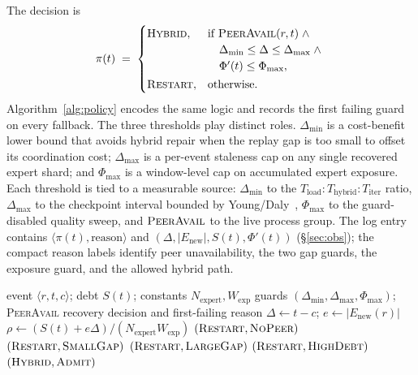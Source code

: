 \documentclass[10pt,conference]{IEEEtran}
\begin{document}
The decision is
\begin{equation}
    \label{eq:policy}
    \pi(t) \;=\;
    \begin{cases}
        \textsc{Hybrid}, & \text{if } \textsc{PeerAvail}(r,t) \;\wedge\; \\
                         & \quad \Delta_{\min} \leq \Delta \leq \Delta_{\max} \;\wedge\; \\
                         & \quad \Phi'(t) \leq \Phi_{\max}, \\[2pt]
        \textsc{Restart}, & \text{otherwise}.
    \end{cases}
\end{equation}
Algorithm~\ref{alg:policy} encodes the same logic and records the first failing guard on every fallback. The three thresholds play distinct roles. $\Delta_{\min}$ is a cost-benefit lower bound that avoids hybrid repair when the replay gap is too small to offset its coordination cost; $\Delta_{\max}$ is a per-event staleness cap on any single recovered expert shard; and $\Phi_{\max}$ is a window-level cap on accumulated expert exposure. Each threshold is tied to a measurable source: $\Delta_{\min}$ to the $T_{\text{load}}\!:\!T_{\text{hybrid}}\!:\!T_{\text{iter}}$ ratio, $\Delta_{\max}$ to the checkpoint interval bounded by Young/Daly~\cite{young1974first,daly2006higher}, $\Phi_{\max}$ to the guard-disabled quality sweep, and $\textsc{PeerAvail}$ to the live process group. The log entry contains $\langle\pi(t),\text{reason}\rangle$ and $(\Delta,|E_{\text{new}}|,S(t),\Phi'(t))$ (\S\ref{sec:obs}); the compact reason labels identify peer unavailability, the two gap guards, the exposure guard, and the allowed hybrid path.

\begin{algorithm}[!b]
\caption{Guarded recovery decision $\pi(t)$.}
\label{alg:policy}
\begin{algorithmic}[1]
\Require event $\langle r,t,c\rangle$; debt $S(t)$; constants $N_{\text{expert}},W_{\mathrm{exp}}$
\Require guards $(\Delta_{\min},\Delta_{\max},\Phi_{\max})$; \textsc{PeerAvail}
\Ensure recovery decision and first-failing reason
\State $\Delta \gets t-c$; $e \gets |E_{\text{new}}(r)|$
\State $\rho \gets (S(t)+e\Delta)/(N_{\text{expert}}W_{\mathrm{exp}})$
    \State \Return $(\textsc{Restart},\textsc{NoPeer})$
\ElsIf{$\Delta < \Delta_{\min}$}
    \State \Return $(\textsc{Restart},\textsc{SmallGap})$
\ElsIf{$\Delta > \Delta_{\max}$}
    \State \Return $(\textsc{Restart},\textsc{LargeGap})$
\ElsIf{$\rho > \Phi_{\max}$}
    \State \Return $(\textsc{Restart},\textsc{HighDebt})$
\Else
    \State \Return $(\textsc{Hybrid},\textsc{Admit})$
\EndIf
\end{algorithmic}
\end{algorithm}
\end{document}
